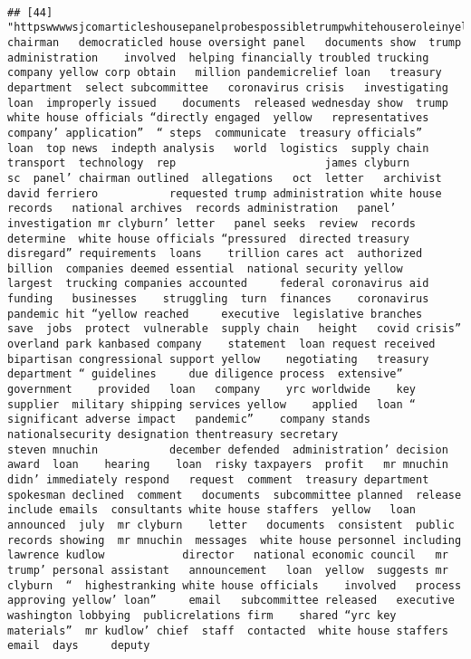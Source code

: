 \documentclass[
]{article}
\begin{document}
\begin{verbatim}
                                                                                                                                                                                                                                                                                                                                                                                                                                                                   
## [44] "httpswwwwsjcomarticleshousepanelprobespossibletrumpwhitehouseroleinyellowcorpbailout  chairman   democraticled house oversight panel   documents show  trump administration    involved  helping financially troubled trucking company yellow corp obtain   million pandemicrelief loan   treasury department  select subcommittee   coronavirus crisis   investigating   loan  improperly issued    documents  released wednesday show  trump white house officials “directly engaged  yellow   representatives   company’ application”  “ steps  communicate  treasury officials”   loan  top news  indepth analysis   world  logistics  supply chain  transport  technology  rep                       james clyburn           sc  panel’ chairman outlined  allegations   oct  letter   archivist                       david ferriero           requested trump administration white house records   national archives  records administration   panel’ investigation mr clyburn’ letter   panel seeks  review  records  determine  white house officials “pressured  directed treasury  disregard” requirements  loans    trillion cares act  authorized  billion  companies deemed essential  national security yellow    largest  trucking companies accounted     federal coronavirus aid funding   businesses    struggling  turn  finances    coronavirus pandemic hit “yellow reached     executive  legislative branches   save  jobs  protect  vulnerable  supply chain   height   covid crisis”  overland park kanbased company    statement  loan request received bipartisan congressional support yellow    negotiating   treasury department “ guidelines     due diligence process  extensive”  government    provided   loan   company    yrc worldwide    key supplier  military shipping services yellow    applied   loan “ significant adverse impact   pandemic”    company stands   nationalsecurity designation thentreasury secretary                       steven mnuchin           december defended  administration’ decision  award  loan    hearing    loan  risky taxpayers  profit   mr mnuchin didn’ immediately respond   request  comment  treasury department spokesman declined  comment   documents  subcommittee planned  release include emails  consultants white house staffers  yellow   loan  announced  july  mr clyburn    letter   documents  consistent  public records showing  mr mnuchin  messages  white house personnel including                       lawrence kudlow            director   national economic council   mr trump’ personal assistant   announcement   loan  yellow  suggests mr clyburn  “  highestranking white house officials    involved   process  approving yellow’ loan”     email   subcommittee released   executive   washington lobbying  publicrelations firm    shared “yrc key materials”  mr kudlow’ chief  staff  contacted  white house staffers  email  days     deputy 
\end{verbatim}
\end{document}

